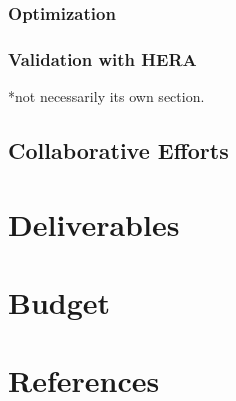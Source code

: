\documentclass[]{article}
\begin{document}
\subsubsection{Optimization}
%
\subsubsection{Validation with HERA}
*not necessarily its own section.
\subsection{Collaborative Efforts}

\section{Deliverables}

\section{Budget}
\section{References}


\end{document}

